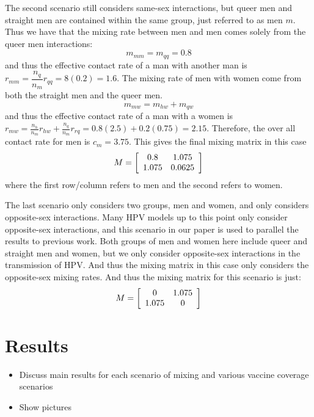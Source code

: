 \documentclass[12pt]{article}
\begin{document}
The second scenario still considers same-sex interactions, but queer men and straight men are contained within the same group, just referred to as men $m$.  Thus we have that the mixing rate between men and men comes solely from the queer men interactions:
\begin{equation}
m_{mm} = m_{qq} = 0.8
\end{equation}
and thus the effective contact rate of a man with another man is $r_{mm} = \dfrac{n_q}{n_m} r_{qq} = 8(0.2) = 1.6$.  The mixing rate of men with women come from both the straight men and the queer men. 
\begin{equation}
m_{mw} = m_{hw} + m_{qw}
\end{equation}
and thus the effective contact rate of a man with a women is $r_{mw} = \frac{n_h}{n_m}r_{hw} + \frac{n_q}{n_m}r_{rq} = 0.8(2.5)+0.2(0.75) = 2.15$.  Therefore, the over all contact rate for men is $c_m=3.75$.  This gives the final mixing matrix in this case
\begin{equation}
M = \left[\begin{array}{c c}
0.8 & 1.075 \\
1.075 & 0.0625 
\end{array}\right]
\end{equation}
where the first row/column refers to men and the second refers to women.  

The last scenario only considers two groups, men and women, and only considers opposite-sex interactions.  Many HPV models up to this point only consider opposite-sex interactions, and this scenario in our paper is used to parallel the results to previous work.  Both groups of men and women here include queer and straight men and women, but we only consider opposite-sex interactions in the transmission of HPV. And thus the mixing matrix in this case only considers the opposite-sex mixing rates.  And thus the mixing matrix for this scenario is just:
\begin{equation}
M=\left[\begin{array}{c c}
0 & 1.075 \\
1.075 & 0
\end{array}\right]
\end{equation}
\section{Results}
\begin{itemize}
\item Discuss main results for each scenario of mixing and various vaccine coverage scenarios
\item Show pictures
\end{itemize}
\end{document}
